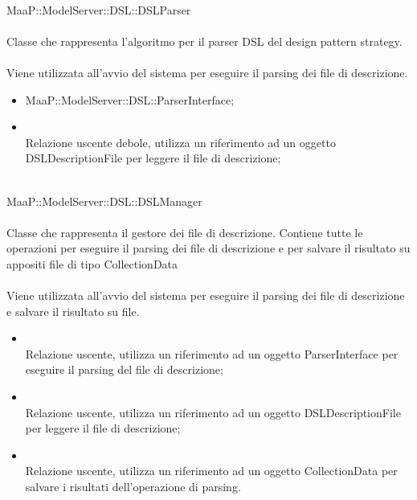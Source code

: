 	\\
	MaaP::ModelServer::DSL::DSLParser\\
	\\
	Classe che rappresenta l'algoritmo per il parser DSL del design pattern strategy.\\
	\\
	Viene utilizzata all'avvio del sistema per eseguire il parsing dei file di descrizione.
	\begin{itemize}
	\item MaaP::ModelServer::DSL::ParserInterface;
	\end{itemize}
	\begin{itemize}
	\item{}\\
	Relazione uscente debole, utilizza un riferimento ad un oggetto DSLDescriptionFile per leggere il file di descrizione;
	\end{itemize}
		
	\\
	MaaP::ModelServer::DSL::DSLManager\\
	\\
	Classe che rappresenta il gestore dei file di descrizione. Contiene tutte le operazioni per eseguire il parsing dei file di descrizione e per salvare il risultato su appositi file di tipo CollectionData\\
	\\
	Viene utilizzata all'avvio del sistema per eseguire il parsing dei file di descrizione e salvare il risultato su file.
	\begin{itemize}
	\item{}\\
	Relazione uscente, utilizza un riferimento ad un oggetto ParserInterface per eseguire il parsing del file di descrizione;
	\item{}\\
	Relazione uscente, utilizza un riferimento ad un oggetto DSLDescriptionFile per leggere il file di descrizione;
	\item{}\\
	Relazione uscente, utilizza un riferimento ad un oggetto CollectionData per salvare i risultati dell'operazione di parsing.
	\end{itemize}
	

